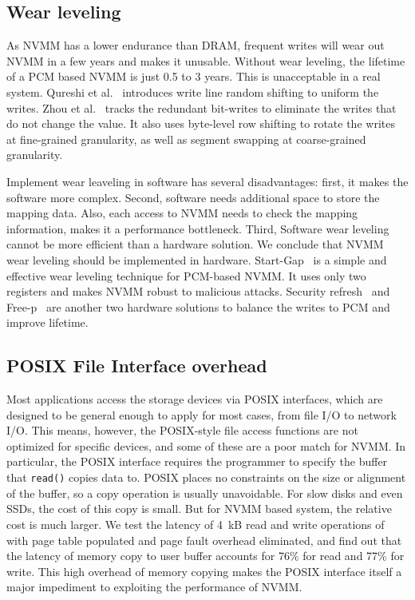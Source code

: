 \subsection{Wear leveling}
\label{sec:wear}
As NVMM has a lower endurance than DRAM, frequent writes will wear out
NVMM in a few years and makes it unusable. Without wear leveling, the lifetime
of a PCM based NVMM is just 0.5 to 3 years. This is unacceptable in a real
system. Qureshi et al.~\cite{PCMHierarchy} introduces write line random
shifting to uniform
the writes. Zhou et al.~\cite{PCM_EfficientMainMemory} tracks the redundant
bit-writes to
eliminate the writes that do not change the value. It also uses byte-level row
shifting to rotate the writes at fine-grained granularity, as well as segment
swapping at coarse-grained granularity.

Implement wear leaveling in software has several disadvantages: first, it makes
the software more complex. Second, software needs additional space to store
the mapping data.
Also, each access to NVMM needs to check the mapping information, makes it
a performance bottleneck.
Third, Software wear leveling cannot be more efficient
than a hardware solution. We conclude that NVMM wear leveling should be
implemented in hardware. Start-Gap~\cite{startgap1} is a simple and effective
wear leveling technique for PCM-based NVMM. It uses only two registers and
makes NVMM robust to malicious attacks. Security refresh~\cite{secrefresh} and
Free-p~\cite{freep}
are another two hardware solutions to balance the writes to PCM and improve
lifetime.

\subsection{POSIX File Interface overhead}
\label{sec:noposix}

Most applications access the storage devices via POSIX interfaces, which are
designed to be general enough to apply for most cases, from file I/O
to network I/O.
This means, however, the POSIX-style file access functions are not optimized
for specific devices, and some of these are a poor match for NVMM.
In particular, the POSIX interface
requires the programmer to specify the buffer that \texttt{read()} copies data
to. POSIX places no constraints on the size
or alignment of the buffer, so a copy operation is usually unavoidable.  For
slow disks and even SSDs, the cost of this copy is small.
But for NVMM based system, the relative cost is much larger.
We test the latency of 4~kB read and
write operations of \DAChell{} with page table populated and page fault overhead
eliminated, and find out that the latency of memory copy to user buffer
accounts for 76\% for read and 77\% for write.
This high overhead of memory copying makes the POSIX interface
itself a major impediment to exploiting the performance of NVMM.

